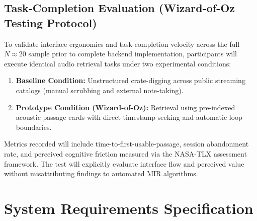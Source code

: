 \subsection{Task-Completion Evaluation (Wizard-of-Oz Testing Protocol)}
To validate interface ergonomics and task-completion velocity across the full $N \approx 20$ sample prior to complete backend implementation, participants will execute identical audio retrieval tasks under two experimental conditions:
\begin{enumerate}
    \item \textbf{Baseline Condition:} Unstructured crate-digging across public streaming catalogs (manual scrubbing and external note-taking).
    \item \textbf{Prototype Condition (Wizard-of-Oz):} Retrieval using pre-indexed acoustic passage cards with direct timestamp seeking and automatic loop boundaries.
\end{enumerate}
Metrics recorded will include time-to-first-usable-passage, session abandonment rate, and perceived cognitive friction measured via the NASA-TLX assessment framework. The test will explicitly evaluate interface flow and perceived value without misattributing findings to automated MIR algorithms.

\section{System Requirements Specification}


